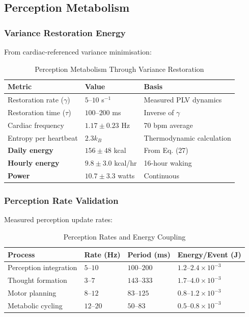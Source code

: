 \documentclass[12pt]{article}
\theoremstyle{remark}
\begin{document}
\subsection{Perception Metabolism}

\subsubsection{Variance Restoration Energy}

From cardiac-referenced variance minimisation:

\begin{table}[H]
\centering
\caption{Perception Metabolism Through Variance Restoration}
\begin{tabular}{@{}lll@{}}
\toprule
\textbf{Metric} & \textbf{Value} & \textbf{Basis} \\
\midrule
Restoration rate ($\gamma$) & $5$--$10$ s$^{-1}$ & Measured PLV dynamics \\
Restoration time ($\tau$) & $100$--$200$ ms & Inverse of $\gamma$ \\
Cardiac frequency & $1.17 \pm 0.23$ Hz & 70 bpm average \\
Entropy per heartbeat & $2.3 k_B$ & Thermodynamic calculation \\
\midrule
\textbf{Daily energy} & $156 \pm 48$ kcal & From Eq. (27) \\
\textbf{Hourly energy} & $9.8 \pm 3.0$ kcal/hr & 16-hour waking \\
\textbf{Power} & $10.7 \pm 3.3$ watts & Continuous \\
\bottomrule
\end{tabular}
\end{table}

\subsubsection{Perception Rate Validation}

Measured perception update rates:

\begin{table}[H]
\centering
\caption{Perception Rates and Energy Coupling}
\begin{tabular}{@{}llll@{}}
\toprule
\textbf{Process} & \textbf{Rate (Hz)} & \textbf{Period (ms)} & \textbf{Energy/Event (J)} \\
\midrule
Perception integration & $5$--$10$ & $100$--$200$ & $1.2$--$2.4 \times 10^{-3}$ \\
Thought formation & $3$--$7$ & $143$--$333$ & $1.7$--$4.0 \times 10^{-3}$ \\
Motor planning & $8$--$12$ & $83$--$125$ & $0.8$--$1.2 \times 10^{-3}$ \\
Metabolic cycling & $12$--$20$ & $50$--$83$ & $0.5$--$0.8 \times 10^{-3}$ \\
\bottomrule
\end{tabular}
\end{table}
\end{document}
